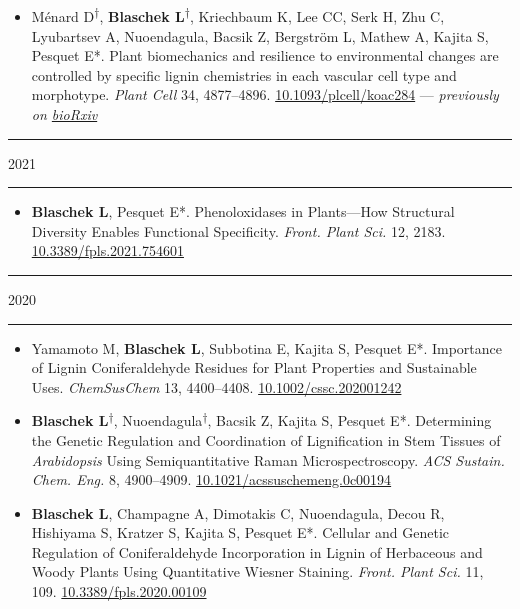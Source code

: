 \documentclass[11pt]{article}
\newcommand*{\xdash}[1][3em]{\rule[0.5ex]{#1}{0.55pt}}
\begin{document}
\vspace{-0.175cm}	
\begin{itemize}[label={},itemindent=-9pt,leftmargin=24pt]
	\itemsep-0.1cm
	\item Ménard D\textsuperscript{$\dagger$}, \textbf{Blaschek L}\textsuperscript{$\dagger$}, Kriechbaum K, Lee CC, Serk H, Zhu C, Lyubartsev A, Nuoendagula, Bacsik Z, Bergström L, Mathew A, Kajita S, Pesquet E*. Plant biomechanics and resilience to environmental changes are controlled by specific lignin chemistries in each vascular cell type and morphotype. \textit{Plant Cell} 34, 4877–4896. \href{https://doi.org/10.1093/plcell/koac284}{10.1093/plcell/koac284} — \textit{previously on \href{https://doi.org/10.1101/2021.06.12.447240}{bioRxiv}}
\end{itemize}

\hspace*{\fill} \xdash[6em] \large{\textsc{2021}} \xdash[6em] \hspace*{\fill} \normalsize

\vspace{-0.175cm}	
\begin{itemize}[label={},itemindent=-9pt,leftmargin=24pt]
	\itemsep-0.1cm
	\item \textbf{Blaschek L}, Pesquet E*. Phenoloxidases in Plants—How Structural Diversity Enables Functional Specificity. \textit{Front. Plant Sci.} 12, 2183.
	\href{https://doi.org/10.3389/fpls.2021.754601}{10.3389/fpls.2021.754601}
\end{itemize}

\hspace*{\fill} \xdash[6em] \large{\textsc{2020}} \xdash[6em] \hspace*{\fill} \normalsize

\vspace{-0.175cm}	
\begin{itemize}[label={},itemindent=-9pt,leftmargin=24pt]
	\itemsep-0.1cm
	\item Yamamoto M, \textbf{Blaschek L}, Subbotina E, Kajita S, Pesquet E*. Importance of Lignin Coniferaldehyde Residues for Plant Properties and Sustainable Uses. \textit{ChemSusChem} 13, 4400–4408.
	\href{https://doi.org/10.1002/cssc.202001242}{10.1002/cssc.202001242}
	\item \textbf{Blaschek L}\textsuperscript{$\dagger$}, Nuoendagula\textsuperscript{$\dagger$}, Bacsik Z, Kajita S, Pesquet E*. Determining the Genetic Regulation and Coordination of Lignification in Stem Tissues of \textit{Arabidopsis} Using Semiquantitative Raman Microspectroscopy. \textit{ACS Sustain. Chem. Eng.} 8, 4900--4909. \href{https://dx.doi.org/10.1021/acssuschemeng.0c00194}{10.1021/acssuschemeng.0c00194}
	\item \textbf{Blaschek L}, Champagne A, Dimotakis C, Nuoendagula, Decou R, Hishiyama S, Kratzer S, Kajita S, Pesquet E*. Cellular and Genetic Regulation of Coniferaldehyde Incorporation in Lignin of Herbaceous and Woody Plants Using Quantitative Wiesner Staining. \textit{Front. Plant Sci.} 11, 109. \href{https://doi.org/10.3389/fpls.2020.00109}{10.3389/fpls.2020.00109}
\end{itemize}
\end{document}
